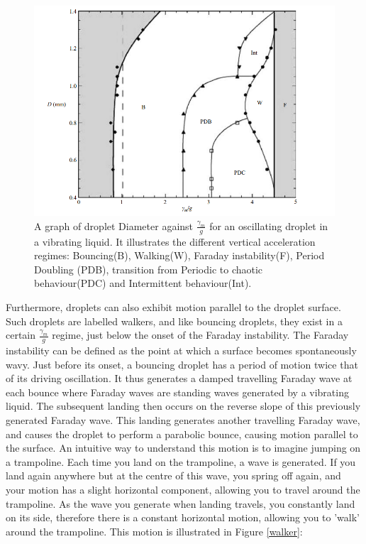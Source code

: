 \begin{figure}[ht]
\includegraphics[width=12cm]{theory/regime}
\centering
\caption{ A graph of droplet Diameter against $\frac{\gamma_{m}}{g}$ for an oscillating droplet in a vibrating liquid. It illustrates the different vertical acceleration regimes: Bouncing(B), Walking(W), Faraday instability(F), Period Doubling (PDB), transition from Periodic to chaotic behaviour(PDC)  and Intermittent behaviour(Int).}
\centering
\label{regimes}
\end{figure}

Furthermore, droplets can also exhibit motion parallel to the droplet surface. Such droplets are labelled walkers, and like bouncing droplets, they exist in a certain $\frac{\gamma_{m}}{g}$ regime, just below the onset of the Faraday instability. The Faraday instability can be defined as the point at which a surface becomes spontaneously wavy. Just before its onset, a bouncing droplet has a period of motion twice that of its driving oscillation. It thus generates a damped travelling Faraday wave at each bounce where Faraday waves are standing waves generated by a vibrating liquid. The subsequent landing then occurs on the reverse slope of this previously generated Faraday wave. This landing generates another travelling Faraday wave, and causes the droplet to perform a parabolic bounce, causing motion parallel to the surface. An intuitive way to understand this motion is to imagine jumping on a trampoline. Each time you land on the trampoline, a wave is generated. If you land again anywhere but at the centre of this wave, you spring off again, and your motion has a slight horizontal component, allowing you to travel around the trampoline. As the wave you generate when landing travels, you constantly land on its side, therefore there is a constant horizontal motion, allowing you to 'walk' around the trampoline. This motion is illustrated in Figure \ref{walker}: 

